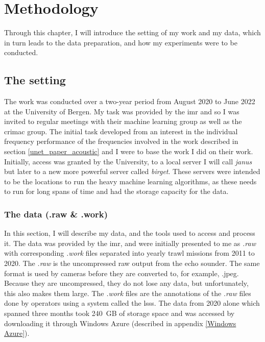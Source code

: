 \chapter{Methodology}
    Through this chapter, I will introduce the setting of my work and my data, which in turn leads to the data preparation, and how my experiments were to be conducted. 
    
    \section{The setting} \label{setting}
        The work was conducted over a two-year period from August 2020 to June 2022 at the University of Bergen. My task was provided by the \gls{imr} and so I was invited to regular meetings with their machine learning group as well as the \gls{crimac} group. The initial task developed from an interest in the individual frequency performance of the frequencies involved in the work described in section \ref{unet_paper_acoustic} and I were to base the work I did on their work. Initially, access was granted by the University, to a local server I will call \textit{janus} but later to a new more powerful server called \textit{birget}. These servers were intended to be the locations to run the heavy machine learning algorithms, as these needs to run for long spans of time and had the storage capacity for the data. 
        
        \subsection{The data (.raw \& .work)}
            In this section, I will describe my data, and the tools used to access and process it. The data was provided by the \gls{imr}, and were initially presented to me as \textit{.raw} \cite{raw} with corresponding \textit{.work} files separated into yearly trawl missions from 2011 to 2020. The \textit{.raw} is the uncompressed raw output from the echo sounder. The same format is used by cameras before they are converted to, for example, .jpeg. Because they are uncompressed, they do not lose any data, but unfortunately, this also makes them large. The \textit{.work} files are the annotations of the \textit{.raw} files done by operators using a system called the \Gls{lsss}\cite{lsss}. The data from 2020 alone which spanned three months took 240 GB of storage space and was accessed by downloading it through Windows Azure (described in appendix \ref{Windows Azure}).
    
